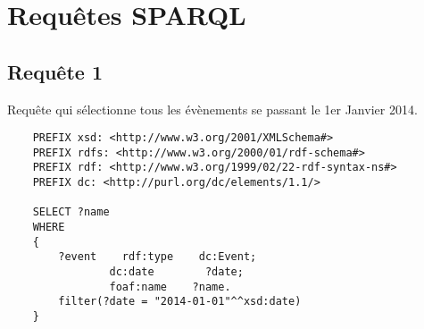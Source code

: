 \documentclass[12pt,a4paper]{article}
\begin{document}
    \section{Requêtes SPARQL}
    
    \subsection{Requête 1}
    Requête qui sélectionne tous les évènements se passant le 1er Janvier 2014.
    \begin{verbatim}
    PREFIX xsd: <http://www.w3.org/2001/XMLSchema#>
    PREFIX rdfs: <http://www.w3.org/2000/01/rdf-schema#>
    PREFIX rdf: <http://www.w3.org/1999/02/22-rdf-syntax-ns#>
    PREFIX dc: <http://purl.org/dc/elements/1.1/>

    SELECT ?name
    WHERE
    {
        ?event    rdf:type    dc:Event;
                dc:date        ?date;
                foaf:name    ?name.
        filter(?date = "2014-01-01"^^xsd:date)
    }
    \end{verbatim}
	
\end{document}
